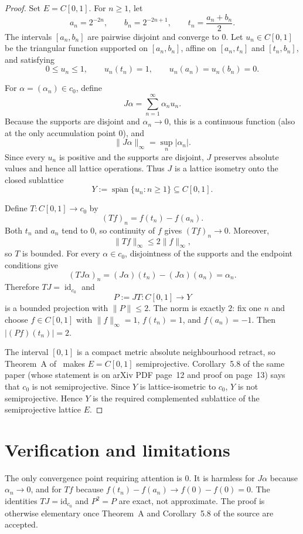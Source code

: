 \documentclass[11pt]{article}
\begin{document}
\begin{proof}
Set $E=C[0,1]$.  For $n\ge1$, let
\[
 a_n=2^{-2n},\qquad b_n=2^{-2n+1},\qquad
 t_n=\frac{a_n+b_n}{2}.
\]
The intervals $[a_n,b_n]$ are pairwise disjoint and converge to $0$.  Let
$u_n\in C[0,1]$ be the triangular function supported on $[a_n,b_n]$, affine
on $[a_n,t_n]$ and $[t_n,b_n]$, and satisfying
\[
 0\le u_n\le1,\qquad u_n(t_n)=1,
 \qquad u_n(a_n)=u_n(b_n)=0.
\]

For $\alpha=(\alpha_n)\in c_0$, define
\[
 J\alpha=\sum_{n=1}^{\infty}\alpha_nu_n.
\]
Because the supports are disjoint and $\alpha_n\to0$, this is a continuous
function (also at the only accumulation point $0$), and
\[
  \|J\alpha\|_\infty=\sup_n|\alpha_n|.
\]
Since every $u_n$ is positive and the supports are disjoint, $J$ preserves
absolute values and hence all lattice operations.  Thus $J$ is a lattice
isometry onto the closed sublattice
\[
  Y:=\overline{\operatorname{span}}\{u_n:n\ge1\}\subseteq C[0,1].
\]

Define $T:C[0,1]\to c_0$ by
\[
   (Tf)_n=f(t_n)-f(a_n).
\]
Both $t_n$ and $a_n$ tend to $0$, so continuity of $f$ gives $(Tf)_n\to0$.
Moreover,
\[
  \|Tf\|_\infty\le2\|f\|_\infty,
\]
so $T$ is bounded.  For every $\alpha\in c_0$, disjointness of the supports
and the endpoint conditions give
\[
  (TJ\alpha)_n=(J\alpha)(t_n)-(J\alpha)(a_n)=\alpha_n.
\]
Therefore $TJ=\operatorname{id}_{c_0}$ and
\[
  P:=JT:C[0,1]\longrightarrow Y
\]
is a bounded projection with $\|P\|\le2$.  The norm is exactly $2$: fix one
$n$ and choose $f\in C[0,1]$ with $\|f\|_\infty=1$, $f(t_n)=1$, and
$f(a_n)=-1$.  Then $|(Pf)(t_n)|=2$.

The interval $[0,1]$ is a compact metric absolute neighbourhood retract, so
Theorem~A of~\cite{source} makes $E=C[0,1]$ semiprojective.  Corollary~5.8 of
the same paper (whose statement is on arXiv PDF page~12 and proof on page~13)
says that $c_0$ is not semiprojective.  Since $Y$ is lattice-isometric to
$c_0$, $Y$ is not semiprojective.  Hence $Y$ is the required complemented
sublattice of the semiprojective lattice $E$.
\end{proof}

\section{Verification and limitations}

The only convergence point requiring attention is $0$.  It is harmless for
$J\alpha$ because $\alpha_n\to0$, and for $Tf$ because
$f(t_n)-f(a_n)\to f(0)-f(0)=0$.  The identities $TJ=\mathrm{id}_{c_0}$ and
$P^2=P$ are exact, not approximate.  The proof is otherwise elementary once
Theorem~A and Corollary~5.8 of the source are accepted.
\end{document}
